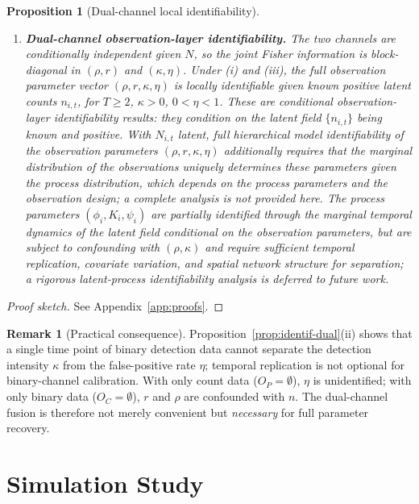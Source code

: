 \documentclass[review,12pt]{elsarticle}
\newtheorem{proposition}[theorem]{Proposition}
\theoremstyle{definition}
\newtheorem{remark}{Remark}
\begin{document}
\begin{proposition}[Dual-channel local identifiability]
\begin{enumerate}[label=(\roman*)]
\item \textbf{Dual-channel observation-layer identifiability.}
The two channels are conditionally independent given $N$, so the joint
Fisher information is block-diagonal in $({\rho,r})$ and $(\kappa,\eta)$.
Under (i) and (iii), the full observation parameter vector $(\rho,r,\kappa,\eta)$
is locally identifiable given known positive latent counts $n_{i,t}$,
for $T\ge2$, $\kappa>0$, $0<\eta<1$.
\emph{These are conditional observation-layer identifiability results:
they condition on the latent field $\{n_{i,t}\}$ being known and positive.}
With $N_{i,t}$ latent, full hierarchical model identifiability of the
observation parameters $(\rho,r,\kappa,\eta)$ additionally requires that
the marginal distribution of the observations uniquely determines these
parameters given the process distribution, which depends on the process
parameters and the observation design; a complete analysis is not provided here.
The process parameters $(\phi_i,K_i,\psi_i)$ are partially identified through
the marginal temporal dynamics of the latent field conditional on the observation
parameters, but are subject to confounding with $(\rho,\kappa)$ and require
sufficient temporal replication, covariate variation, and spatial network
structure for separation; a rigorous latent-process identifiability analysis
is deferred to future work.
\end{enumerate}
\end{proposition}

\begin{proof}[Proof sketch]
See Appendix~\ref{app:proofs}.
\end{proof}

\begin{remark}[Practical consequence]\label{rem:identif}
Proposition~\ref{prop:identif-dual}(ii) shows that a single time point of binary
detection data cannot separate the detection intensity $\kappa$ from the
false-positive rate $\eta$; temporal replication is not optional for
binary-channel calibration.  With only count data ($O_P=\emptyset$),
$\eta$ is unidentified; with only binary data ($O_C=\emptyset$), $r$ and
$\rho$ are confounded with $n$.  The dual-channel fusion is therefore not
merely convenient but \emph{necessary} for full parameter recovery.
\end{remark}

\section{Simulation Study}
\label{sec:simulation}
\end{document}
